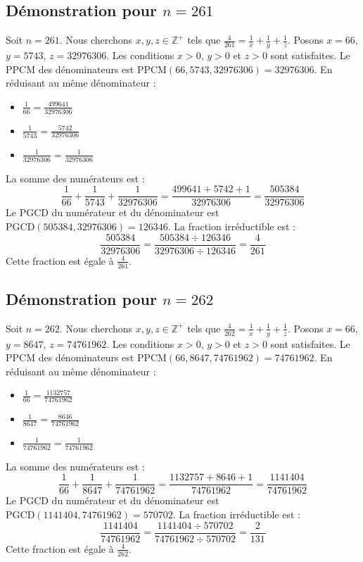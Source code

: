 \documentclass[11pt,a4paper]{article}
\begin{document}
\subsection{Démonstration pour $n = 261$}
Soit $n = 261$. Nous cherchons $x, y, z \in \mathbb{Z}^{+}$ tels que $\frac{4}{261} = \frac{1}{x} + \frac{1}{y} + \frac{1}{z}$.
Posons $x = 66$, $y = 5743$, $z = 32976306$.
Les conditions $x > 0$, $y > 0$ et $z > 0$ sont satisfaites.
Le PPCM des dénominateurs est $\text{PPCM}(66, 5743, 32976306) = 32976306$.
En réduisant au même dénominateur :
\begin{itemize}
    \item $\frac{1}{66} = \frac{499641}{32976306}$
    \item $\frac{1}{5743} = \frac{5742}{32976306}$
    \item $\frac{1}{32976306} = \frac{1}{32976306}$
\end{itemize}
La somme des numérateurs est :
$$ \frac{1}{66} + \frac{1}{5743} + \frac{1}{32976306} = \frac{499641 + 5742 + 1}{32976306} = \frac{505384}{32976306} $$
Le PGCD du numérateur et du dénominateur est $\text{PGCD}(505384, 32976306) = 126346$.
La fraction irréductible est :
$$ \frac{505384}{32976306} = \frac{505384 \div 126346}{32976306 \div 126346} = \frac{4}{261} $$
Cette fraction est égale à $\frac{4}{261}$.

\subsection{Démonstration pour $n = 262$}
Soit $n = 262$. Nous cherchons $x, y, z \in \mathbb{Z}^{+}$ tels que $\frac{4}{262} = \frac{1}{x} + \frac{1}{y} + \frac{1}{z}$.
Posons $x = 66$, $y = 8647$, $z = 74761962$.
Les conditions $x > 0$, $y > 0$ et $z > 0$ sont satisfaites.
Le PPCM des dénominateurs est $\text{PPCM}(66, 8647, 74761962) = 74761962$.
En réduisant au même dénominateur :
\begin{itemize}
    \item $\frac{1}{66} = \frac{1132757}{74761962}$
    \item $\frac{1}{8647} = \frac{8646}{74761962}$
    \item $\frac{1}{74761962} = \frac{1}{74761962}$
\end{itemize}
La somme des numérateurs est :
$$ \frac{1}{66} + \frac{1}{8647} + \frac{1}{74761962} = \frac{1132757 + 8646 + 1}{74761962} = \frac{1141404}{74761962} $$
Le PGCD du numérateur et du dénominateur est $\text{PGCD}(1141404, 74761962) = 570702$.
La fraction irréductible est :
$$ \frac{1141404}{74761962} = \frac{1141404 \div 570702}{74761962 \div 570702} = \frac{2}{131} $$
Cette fraction est égale à $\frac{4}{262}$.
\end{document}
